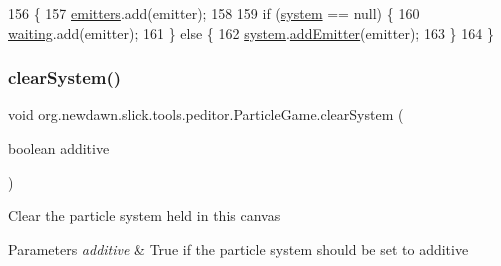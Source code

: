 \begin{DoxyCode}
156                                                         \{
157         \mbox{\hyperlink{classorg_1_1newdawn_1_1slick_1_1tools_1_1peditor_1_1_particle_game_a85dc9d5055b69f5a7ade60036db5d668}{emitters}}.add(emitter);
158 
159         \textcolor{keywordflow}{if} (\mbox{\hyperlink{classorg_1_1newdawn_1_1slick_1_1tools_1_1peditor_1_1_particle_game_a3a6d42e312039ae4f175e6751256f2f7}{system}} == null) \{
160             \mbox{\hyperlink{classorg_1_1newdawn_1_1slick_1_1tools_1_1peditor_1_1_particle_game_a9367c18a64d4ce360473c18d7d81b85b}{waiting}}.add(emitter);
161         \} \textcolor{keywordflow}{else} \{
162             \mbox{\hyperlink{classorg_1_1newdawn_1_1slick_1_1tools_1_1peditor_1_1_particle_game_a3a6d42e312039ae4f175e6751256f2f7}{system}}.\mbox{\hyperlink{classorg_1_1newdawn_1_1slick_1_1particles_1_1_particle_system_abeb4a1cb7f8677cf28b82f1e49f1f0ce}{addEmitter}}(emitter);
163         \}
164     \}
\end{DoxyCode}
\mbox{\label{classorg_1_1newdawn_1_1slick_1_1tools_1_1peditor_1_1_particle_game_a35c4aec3f19a81ace80cd0ba3929680d}} 
\subsubsection{\texorpdfstring{clear\+System()}{clearSystem()}}
{\footnotesize\ttfamily void org.\+newdawn.\+slick.\+tools.\+peditor.\+Particle\+Game.\+clear\+System (\begin{DoxyParamCaption}\item[{boolean}]{additive }\end{DoxyParamCaption})\hspace{0.3cm}{\ttfamily [inline]}}

Clear the particle system held in this canvas


\begin{DoxyParams}{Parameters}
{\em additive} & True if the particle system should be set to additive \\
\hline
\end{DoxyParams}

